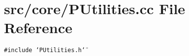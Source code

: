 \section{src/core/PUtilities.cc File Reference}
\label{PUtilities_8cc}


{\tt \#include \char`\"{}PUtilities.h\char`\"{}}\par

